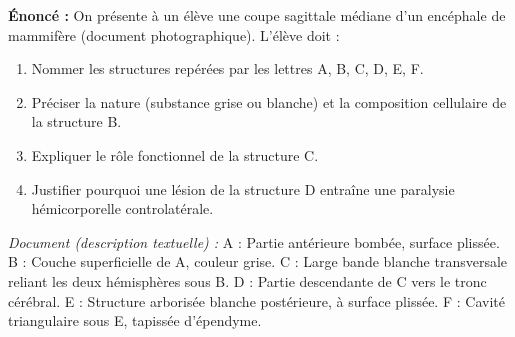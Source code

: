 \documentclass[11pt]{article}
\begin{document}
\begin{exoresolu}
\textbf{Énoncé :} On présente à un élève une coupe sagittale médiane d'un encéphale de mammifère (document photographique). L'élève doit :
\begin{enumerate}
    \item Nommer les structures repérées par les lettres A, B, C, D, E, F.
    \item Préciser la nature (substance grise ou blanche) et la composition cellulaire de la structure B.
    \item Expliquer le rôle fonctionnel de la structure C.
    \item Justifier pourquoi une lésion de la structure D entraîne une paralysie hémicorporelle controlatérale.
\end{enumerate}
\textit{Document (description textuelle) :} A : Partie antérieure bombée, surface plissée. B : Couche superficielle de A, couleur grise. C : Large bande blanche transversale reliant les deux hémisphères sous B. D : Partie descendante de C vers le tronc cérébral. E : Structure arborisée blanche postérieure, à surface plissée. F : Cavité triangulaire sous E, tapissée d'épendyme.


\end{exoresolu}
\end{document}

